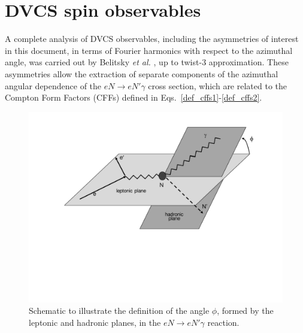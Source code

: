 \section{DVCS spin observables}\label{sec_dvcs_obs}
A complete analysis of DVCS observables, including the asymmetries of interest in this document, in terms of Fourier harmonics with respect to the azimuthal angle, was carried out by Belitsky {\it et al.} \cite{belitski}, up to twist-3 approximation. 
These asymmetries allow the extraction of separate components of the azimuthal angular dependence of the $eN \to eN'\gamma$ cross section, which are related to the Compton Form Factors (CFFs) defined in Eqs.~\ref{def_cffs1}-\ref{def_cffs2}.%
\begin{figure}[h]
\begin{center}
\includegraphics[width=120mm]{dvcs_diagram.pdf}
\vspace{-3.cm}
\caption[$eN \to eN'\gamma$ reaction plane.]{Schematic to illustrate the definition of the angle $\phi$, formed by the leptonic and hadronic planes, in the $eN \to eN'\gamma$ reaction.}
\label{fig:dvcs_phi}
\end{center}
\end{figure}

